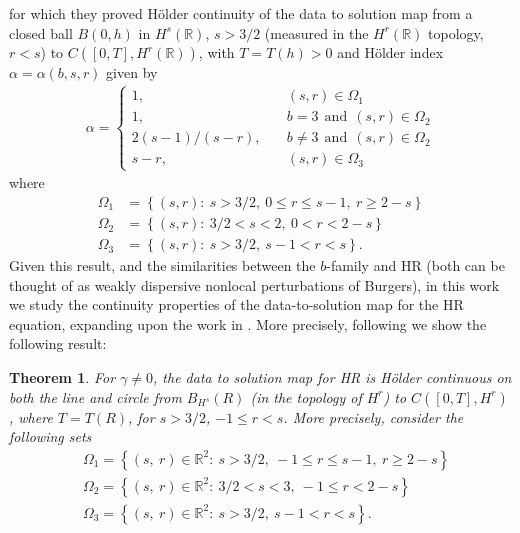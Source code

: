\documentclass[12pt,reqno]{amsart}
\numberwithin{equation}{section}  %
\numberwithin{figure}{section}
\newcommand{\rr}{\mathbb{R}}
\newtheorem{theorem}{Theorem}
\begin{document}
%
%
for which they proved H\"older continuity of the data to solution map from a closed ball $B(0, h)$ in $H^{s}(\rr)$, $s >
3/2$ (measured in the $H^{r}(\rr)$ topology, $r <s$) to $C([0, T], H^{r}(\rr))$, with $T
= T(h)> 0$ and H\"older index $\alpha = \alpha(b, s, r)$ given by 
%
%
\begin{equation*}
\begin{split}
\alpha = 
\begin{cases}
1, \quad & (s, r) \in \Omega_{1}
\\
1, \quad & b=3 \ \ \text{and} \ \ (s, r) \in \Omega_{2}
\\
2(s-1)/(s-r), \quad  & b\neq 3 \ \ \text{and} \ \ (s, r) \in \Omega_{2}
\\
s-r, \quad & (s, r) \in \Omega_{3}
\end{cases}
\end{split}
\end{equation*}
%
%
where
\begin{equation*}
\begin{split}
\Omega_{1} & = \left\{ (s, r): \   s > 3/2, \ 0 \le r \le s-1, \  r \ge 2-s \right\}
\\
\Omega_{2} & = \left\{(s, r): \  3/2 < s < 2, \ 0 < r < 2-s   \right\}
\\
\Omega_{3} & = \left\{ (s,r): \  s > 3/2, \ s-1 < r < s  \right\}.
\end{split}
\end{equation*}
Given this result, and the similarities between the $b$-family and HR (both can
be thought of as weakly dispersive nonlocal perturbations of Burgers), in this
work we study the continuity properties of the
data-to-solution map for the HR equation, expanding upon the work in
\cite{Karapetyan:2010hk}. More precisely, following \cite{Chen:2011aa} we show
the following result:
%
%
\begin{theorem}
For $\gamma \neq 0$, the
data to solution map for HR is H\"older continuous on both the line and circle from $B_{H^{s}}(R)$ (in
the topology of $H^{r}$) to $C([0, T], H^{r})$, where $T = T(R)$, for $s >
3/2$, $-1 \le r < s$. More
precisely, consider the following sets 
%
%
\begin{equation*}
\begin{split}
& \Omega_{1} = \left\{ (s, \ r) \in \rr^{2}:
\ s>3/2, \ -1 \le r \le s-1, \  r \ge 2 -s  \right\}
\\
& \Omega_{2} = \left\{ (s, \ r) \in \rr^{2}:
\ 3/2 < s < 3, \ -1 \le r < 2-s \right\}
\\
& \Omega_{3} = \left\{ (s, \ r) \in \rr^{2}:
\  s>3/2, \  s-1 < r < s  \right\}.
\end{split}
\end{equation*}
%
%
\label{thm:main-thm}
\end{theorem}
\end{document}
